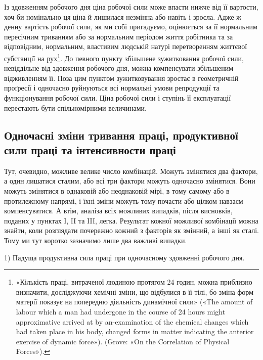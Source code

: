 Із здовженням робочого дня ціна робочої сили може впасти
нижче від її вартости, хоч би номінально ця ціна й лишилася
незмінна або навіть і зросла. Адже ж денну вартість робочої сили,
як ми собі пригадуємо, оцінюється за її нормальним пересічним
триванням або за нормальним періодом життя робітника та за
відповідним, нормальним, властивим людській натурі перетворенням
життєвої субстанції на рух\footnote{
«Кількість праці, витраченої людиною протягом 24 годин, можна
приблизно визначити, досліджуючи хемічні зміни, що відбулися в її
тілі, бо зміна форм матерії показує на попередню діяльність динамічної
сили» («The amount of labour which a man had undergone in the course
of 24 hours might approximative arrived at by an-examination of the
chemical changes which had taken place in his body, changed forms in
matter indicating the anterior exercise of dynamic force»). (Grove: «On
the Correlation of Physical Forces»).
}. До певного пункту збільшене
зужитковання робочої сили, невіддільне від здовження
робочого дня, можна компенсувати збільшеним відживленням її.
Поза цим пунктом зужитковування зростає в геометричній проґресії
і одночасно руйнуються всі нормальні умови репродукції
та функціонування робочої сили. Ціна робочої сили і ступінь
її експлуатації перестають бути спільномірними величинами.

\manualpagebreak{}
\subsection{Одночасні зміни тривання праці, продуктивної сили праці
та інтенсивности праці}

Тут, очевидно, можливе велике число комбінацій. Можуть
змінятися два фактори, а один лишатися сталим, або всі три фактори
можуть одночасно змінятися. Вони можуть змінятися в
однаковій або неоднаковій мірі, в тому самому або в протилежному
напрямі, і їхні зміни можуть тому почасти або цілком
навзаєм компенсуватися. А втім, аналіза всіх можливих випадків,
після висновків, поданих у пунктах І, II та III, легка. Результат
кожної можливої комбінації можна знайти, коли розглядати
почережно кожний з факторів як змінний, а інші як сталі.
Тому ми тут коротко зазначимо лише два важливі випадки.

1) Падуща продуктивна сила праці при одночасному здовженні
робочого дня.

